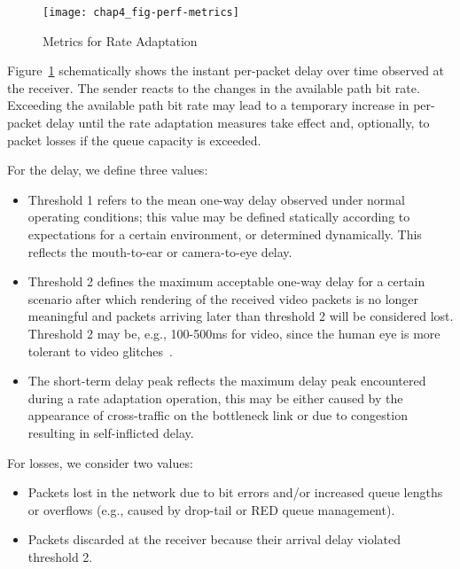 


\begin{figure}
\centering
\texttt{[image: chap4\_fig-perf-metrics]}
\caption{Metrics for Rate Adaptation}
\label{fig:4:rc_model}
\end{figure}

Figure~\ref{fig:4:rc_model} schematically shows the instant per-packet delay
over time observed at the receiver. The sender reacts to the changes in the
available path bit rate. Exceeding the available path bit rate may lead to a
temporary increase in per-packet delay until the rate adaptation measures take
effect and, optionally, to packet losses if the queue capacity is exceeded.

For the delay, we define three values:

\begin{itemize}
\setlength{\itemsep}{0pt}

\item Threshold 1 refers to the mean one-way delay observed under normal
operating conditions; this value may be defined statically according to
expectations for a certain environment, or determined dynamically. This
reflects the mouth-to-ear or camera-to-eye delay.

\item Threshold 2 defines the maximum acceptable one-way delay for a certain
scenario after which rendering of the received video packets is no longer
meaningful and packets arriving later than threshold 2 will be considered
lost. Threshold 2 may be, e.g., 100-500ms for video, since the human eye is
more tolerant to video glitches~\cite{s4.eval.fw}.

\item The short-term delay peak reflects the maximum delay peak encountered
during a rate adaptation operation, this may be either caused by the
appearance of cross-traffic on the bottleneck link or due to congestion
resulting in self-inflicted delay.

\end{itemize}

For losses, we consider two values:

\begin{itemize}
\setlength{\itemsep}{0pt}

\item Packets lost in the network due to bit errors and/or increased queue
lengths or overflows (e.g., caused by drop-tail or RED queue management).

\item Packets discarded at the receiver because their arrival delay violated
threshold 2.

\end{itemize}

